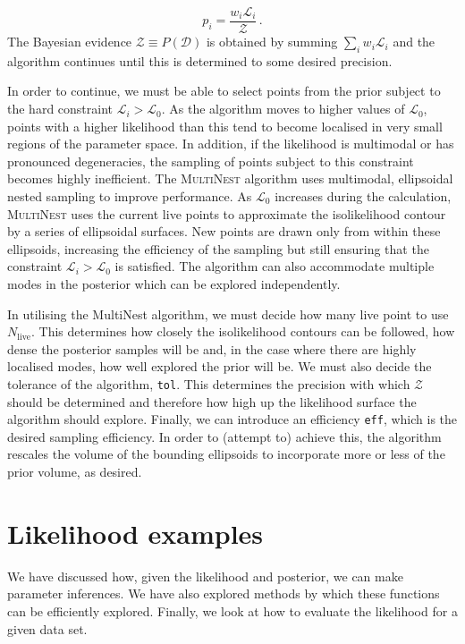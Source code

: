 \begin{equation}
p_i = \frac{w_i \mathcal{L}_i}{\mathcal{Z}}\,.
\end{equation}
The Bayesian evidence $\mathcal{Z} \equiv P(\mathcal{D})$ is obtained by summing $\sum_i w_i \mathcal{L}_i$ and the algorithm continues until this is determined to some desired precision.

In order to continue, we must be able to select points from the prior subject to the hard constraint $\mathcal{L}_i > \mathcal{L}_0$. As the algorithm moves to higher values of $\mathcal{L}_0$, points with a higher likelihood than this tend to become localised in very small regions of the parameter space. In addition, if the likelihood is multimodal or has pronounced degeneracies, the sampling of points subject to this constraint becomes highly inefficient. The \textsc{MultiNest} algorithm \cite{Feroz:2007,Feroz:2008,Feroz:2014} uses multimodal, ellipsoidal nested sampling to improve performance. As $\mathcal{L}_0$ increases during the calculation,  \textsc{MultiNest} uses the current live points to approximate the isolikelihood contour by a series of ellipsoidal surfaces. New points are drawn only from within these ellipsoids, increasing the efficiency of the sampling but still ensuring that the constraint $\mathcal{L}_i > \mathcal{L}_0$ is satisfied. The algorithm can also accommodate multiple modes in the posterior which can be explored independently.

In utilising the MultiNest algorithm, we must decide how many live point to use $N_\textrm{live}$. This determines how closely the isolikelihood contours can be followed, how dense the posterior samples will be and, in the case where there are highly localised modes, how well explored the prior will be. We must also decide the tolerance of the algorithm, \texttt{tol}. This determines the precision with which $\mathcal{Z}$ should be determined and therefore how high up the likelihood surface the algorithm should explore. Finally, we can introduce an efficiency \texttt{eff}, which is the desired sampling efficiency. In order to (attempt to) achieve this, the algorithm rescales the volume of the bounding ellipsoids to incorporate more or less of the prior volume, as desired. 

\section{Likelihood examples}

We have discussed how, given the likelihood and posterior, we can make parameter inferences. We have also explored methods by which these functions can be efficiently explored. Finally, we look at how to evaluate the likelihood for a given data set. 

